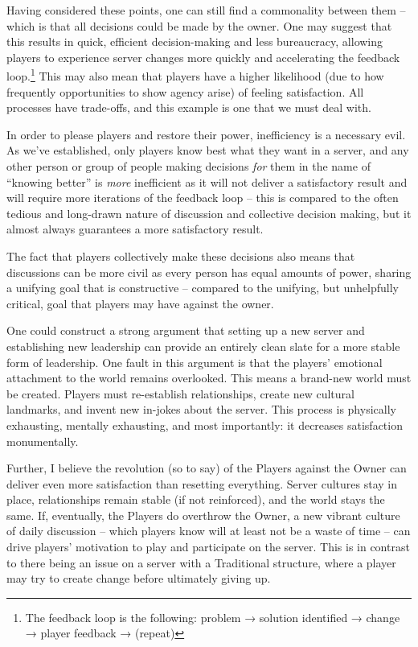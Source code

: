 Having considered these points, one can still find a commonality between them – which is that all decisions could be made by the owner. One may suggest that this results in quick, efficient decision-making and less bureaucracy, allowing players to experience server changes more quickly and accelerating the feedback loop.\footnote{The feedback loop is the following: problem → solution identified → change → player feedback → (repeat)} This may also mean that players have a higher likelihood (due to how frequently opportunities to show agency arise) of feeling satisfaction. All processes have trade-offs, and this example is one that we must deal with.

In order to please players and restore their power, inefficiency is a necessary evil. As we’ve established, only players know best what they want in a server, and any other person or group of people making decisions \emph{for} them in the name of “knowing better” is \emph{more} inefficient as it will not deliver a satisfactory result and will require more iterations of the feedback loop – this is compared to the often tedious and long-drawn nature of discussion and collective decision making, but it almost always guarantees a more satisfactory result.

The fact that players collectively make these decisions also means that discussions can be more civil as every person has equal amounts of power, sharing a unifying goal that is constructive – compared to the unifying, but unhelpfully critical, goal that players may have against the owner.

One could construct a strong argument that setting up a new server and establishing new leadership can provide an entirely clean slate for a more stable form of leadership. One fault in this argument is that the players’ emotional attachment to the world remains overlooked. This means a brand-new world must be created. Players must re-establish relationships, create new cultural landmarks, and invent new in-jokes about the server. This process is physically exhausting, mentally exhausting, and most importantly: it decreases satisfaction monumentally.

Further, I believe the revolution (so to say) of the Players against the Owner can deliver even more satisfaction than resetting everything. Server cultures stay in place, relationships remain stable (if not reinforced), and the world stays the same. If, eventually, the Players do overthrow the Owner, a new vibrant culture of daily discussion – which players know will at least not be a waste of time – can drive players’ motivation to play and participate on the server. This is in contrast to there being an issue on a server with a Traditional structure, where a player may try to create change before ultimately giving up.

